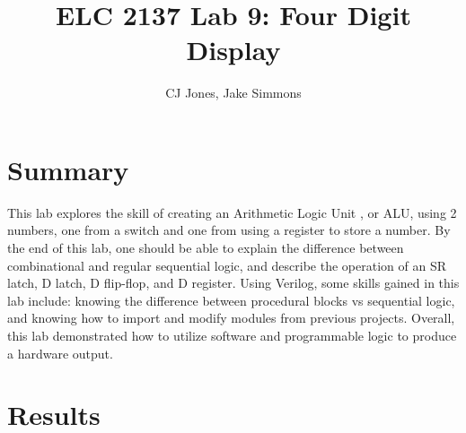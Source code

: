 \documentclass[11pt]{article}
\begin{document}
\title{ELC 2137 Lab 9: Four Digit Display}
\author{CJ Jones, Jake Simmons}

\maketitle


\section*{Summary}

This lab explores the skill of creating an Arithmetic Logic Unit , or ALU, using 2 numbers, one from a switch and one from using a register to store a number. By the end of this lab, one should be able to explain the difference between combinational and regular sequential logic, and describe the operation of an SR latch, D latch, D flip-flop, and D register. Using Verilog, some skills gained in this lab include: knowing the difference between procedural blocks vs sequential logic, and knowing how to import and modify modules from previous projects. Overall, this lab demonstrated how to utilize software and programmable logic to produce a hardware output.













\section*{Results}
\end{document}
